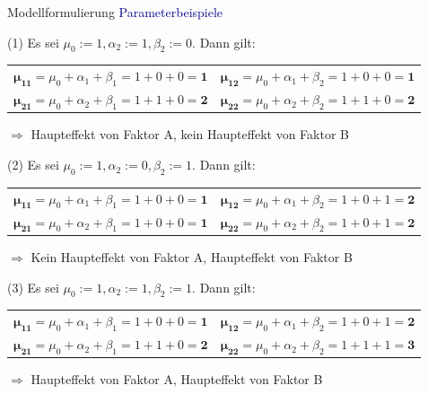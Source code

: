 \documentclass[
  8pt,
  ignorenonframetext,
]{beamer}
\begin{document}
\begin{frame}{Modellformulierung}
\protect\hypertarget{modellformulierung-2}{}
\textcolor{darkblue}{Parameterbeispiele}

\small
{}

\noindent (1) Es sei \(\mu_0 := 1, \alpha_2 := 1, \beta_2 := 0\). Dann
gilt:

\begin{center}
\begin{tabular}{ll}
$\bm{\mu_{11}} = \mu_0 + \alpha_1 + \beta_1 = 1 + 0 + 0 = \bm{1}$
&
$\bm{\mu_{12}} = \mu_0 + \alpha_1 + \beta_2 = 1 + 0 + 0 = \bm{1}$
\\
$\bm{\mu_{21}} = \mu_0 + \alpha_2 + \beta_1 = 1 + 1 + 0 = \bm{2}$
&
$\bm{\mu_{22}} = \mu_0 + \alpha_2 + \beta_2 = 1 + 1 + 0 = \bm{2}$ \\
\end{tabular}
\end{center}

\(\Rightarrow\) Haupteffekt von Faktor A, kein Haupteffekt von Faktor B
\vspace{1mm}

\noindent (2) Es sei \(\mu_0 := 1, \alpha_2 := 0, \beta_2 := 1\). Dann
gilt:

\begin{center}
\begin{tabular}{ll}
$\bm{\mu_{11}} = \mu_0 + \alpha_1 + \beta_1 = 1 + 0 + 0 = \bm{1}$
&
$\bm{\mu_{12}} = \mu_0 + \alpha_1 + \beta_2 = 1 + 0 + 1 = \bm{2}$
\\
$\bm{\mu_{21}} = \mu_0 + \alpha_2 + \beta_1 = 1 + 0 + 0 = \bm{1}$
&
$\bm{\mu_{22}} = \mu_0 + \alpha_2 + \beta_2 = 1 + 0 + 1 = \bm{2}$ \\
\end{tabular}
\end{center}

\(\Rightarrow\) Kein Haupteffekt von Faktor A, Haupteffekt von Faktor B
\vspace{1mm}

\noindent (3) Es sei \(\mu_0 := 1, \alpha_2 := 1, \beta_2 := 1\). Dann
gilt:

\begin{center}
\begin{tabular}{ll}
$\bm{\mu_{11}} = \mu_0 + \alpha_1 + \beta_1 = 1 + 0 + 0 = \bm{1}$
&
$\bm{\mu_{12}} = \mu_0 + \alpha_1 + \beta_2 = 1 + 0 + 1 = \bm{2}$
\\
$\bm{\mu_{21}} = \mu_0 + \alpha_2 + \beta_1 = 1 + 1 + 0 = \bm{2}$
&
$\bm{\mu_{22}} = \mu_0 + \alpha_2 + \beta_2 = 1 + 1 + 1 = \bm{3}$ \\
\end{tabular}
\end{center}

\(\Rightarrow\) Haupteffekt von Faktor A, Haupteffekt von Faktor B
\end{frame}
\end{document}
